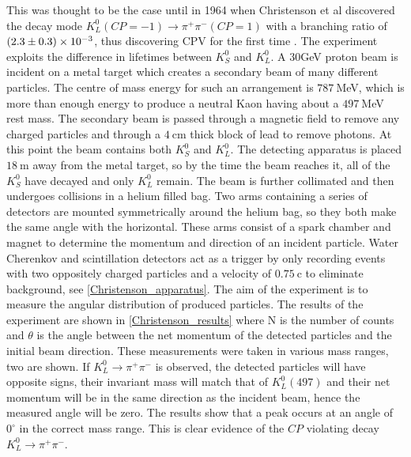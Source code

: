 This was thought to be the case until in 1964 when Christenson et al discovered the decay mode $K^{0}_{L}(CP = -1) \rightarrow \pi^+ \pi^- (CP = 1)$ with a branching ratio of $(2.3 \pm 0.3) \times 10^{-3}$, thus discovering CPV for the first time \cite{FirstCPV}. The experiment exploits the difference in lifetimes between $K^{0}_{S}$ and $K^{0}_{L}$. A 30GeV proton beam is incident on a metal target which creates a secondary beam of many different particles. The centre of mass energy for such an arrangement is $787~$MeV, which is more than enough energy to produce a neutral Kaon having about a $497~$MeV rest mass. The secondary beam is passed through a magnetic field to remove any charged particles and through a $4~$cm thick block of lead to remove photons. At this point the beam contains both $K^{0}_{S}$ and $K^{0}_{L}$. The detecting apparatus is placed $18~$m away from the metal target, so by the time the beam reaches it, all of the $K^{0}_{S}$ have decayed and only $K^{0}_{L}$ remain. The beam is further collimated and then undergoes collisions in a helium filled bag. Two arms containing a series of detectors are mounted symmetrically around the helium bag, so they both make the same angle with the horizontal. These arms consist of a spark chamber and magnet to determine the momentum and direction of an incident particle. Water Cherenkov and scintillation detectors act as a trigger by only recording events with two oppositely charged particles and a velocity of $0.75~$c to eliminate background, see \cref{Christenson_apparatus}. The aim of the experiment is to measure the angular distribution of produced particles. The results of the experiment are shown in \cref{Christenson_results} where N is the number of counts and $\theta$ is the angle between the net momentum of the detected particles and the initial beam direction. These measurements were taken in various mass ranges, two are shown. If $K^{0}_{L} \rightarrow \pi^+ \pi^-$ is observed, the detected particles will have opposite signs, their invariant mass will match that of $K^{0}_{L}(497)$ and their net momentum will be in the same direction as the incident beam, hence the measured angle will be zero. The results show that a peak occurs at an angle of $0^{\circ}$ in the correct mass range. This is clear evidence of the $CP$ violating decay $K^{0}_{L} \rightarrow \pi^+ \pi^-$.   

